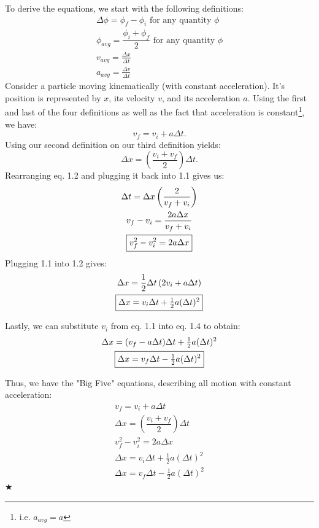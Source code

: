 \noindent To derive the equations, we start with the following definitions:
\begin{gather*}
\Delta \phi = \phi_f - \phi_i \text{ for any quantity } \phi \\
\phi_{avg} = \dfrac{\phi_i + \phi_f}{2} \text{ for any quantity }\phi \\
v_{avg} = \frac{\Delta x}{\Delta t} \\
a_{avg} = \frac{\Delta v}{\Delta t} 
\end{gather*}
\noindent Consider a particle moving kinematically (with constant acceleration). It's position is represented by $x$, its velocity $v$, and its acceleration $a$. Using the first and last of the four definitions as well as the fact that acceleration is constant\footnote{i.e. $a_{avg} = a$}, we have:
\begin{equation}
\boxed{v_f = v_i + a\Delta t}.
\end{equation}
\noindent Using our second definition on our third definition yields:
\begin{equation}
\boxed{\Delta x = \left( \dfrac{v_i + v_f}{2}\right) \Delta t}.
\end{equation}
\noindent Rearranging eq. 1.2 and plugging it back into 1.1 gives us:
\begin{gather}
\Delta t = \Delta x \left(\dfrac{2}{v_f + v_i}\right) \nonumber \\
v_f - v_i = \dfrac{2a\Delta x}{v_f + v_i} \nonumber \\
\boxed{v_f^2 - v_i^2 = 2a\Delta x}
\end{gather}
\clearpage
\noindent Plugging 1.1 into 1.2 gives:
\begin{gather}
\Delta x = \frac12 \Delta t \left( 2v_i + a\Delta t\right) \nonumber \\
\boxed{\Delta x = v_i\Delta t + \tfrac12 a (\Delta t)^2}
\end{gather}

\noindent Lastly, we can substitute $v_i$ from eq. 1.1 into eq. 1.4 to obtain:
\begin{gather}
\Delta x = (v_f-a\Delta t)\Delta t + \tfrac12 a(\Delta t)^2  \nonumber \\
\boxed{\Delta x = v_f\Delta t - \tfrac12 a(\Delta t)^2}
\end{gather}

\noindent Thus, we have the "Big Five" equations, describing all motion with constant acceleration:
\begin{gather}
v_f = v_i + a\Delta t \label{kin1}\\
\Delta x = \left( \dfrac{v_i + v_f}{2}\right) \Delta t \label{kin2} \\
v_f^2 - v_i^2 = 2a\Delta x \label{kin3} \\
\Delta x = v_i\Delta t + \tfrac12 a (\Delta t)^2 \label{kin4} \\
\Delta x = v_f\Delta t - \tfrac12 a(\Delta t)^2 \label{kin5}
\end{gather}
$\bigstar$


